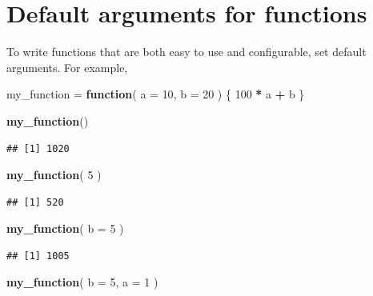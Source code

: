 \documentclass[
]{book}
\newenvironment{Shaded}{\begin{snugshade}}{\end{snugshade}}
\newcommand{\AttributeTok}[1]{\textcolor[rgb]{0.13,0.29,0.53}{#1}}
\newcommand{\ControlFlowTok}[1]{\textcolor[rgb]{0.13,0.29,0.53}{\textbf{#1}}}
\newcommand{\DecValTok}[1]{\textcolor[rgb]{0.00,0.00,0.81}{#1}}
\newcommand{\FunctionTok}[1]{\textcolor[rgb]{0.13,0.29,0.53}{\textbf{#1}}}
\newcommand{\NormalTok}[1]{#1}
\newcommand{\OtherTok}[1]{\textcolor[rgb]{0.56,0.35,0.01}{#1}}
\newcommand{\SpecialCharTok}[1]{\textcolor[rgb]{0.81,0.36,0.00}{\textbf{#1}}}
\begin{document}
\section{Default arguments for functions}\label{default-arguments}

To write functions that are both easy to use and configurable, set default arguments.
For example,

\begin{Shaded}
\begin{Highlighting}[]
\NormalTok{my\_function }\OtherTok{=} \ControlFlowTok{function}\NormalTok{( }\AttributeTok{a =} \DecValTok{10}\NormalTok{, }\AttributeTok{b =} \DecValTok{20}\NormalTok{ ) \{}
     \DecValTok{100} \SpecialCharTok{*}\NormalTok{ a }\SpecialCharTok{+}\NormalTok{ b}
\NormalTok{\}}

\FunctionTok{my\_function}\NormalTok{()}
\end{Highlighting}
\end{Shaded}

\begin{verbatim}
## [1] 1020
\end{verbatim}

\begin{Shaded}
\begin{Highlighting}[]
\FunctionTok{my\_function}\NormalTok{( }\DecValTok{5}\NormalTok{ )}
\end{Highlighting}
\end{Shaded}

\begin{verbatim}
## [1] 520
\end{verbatim}

\begin{Shaded}
\begin{Highlighting}[]
\FunctionTok{my\_function}\NormalTok{( }\AttributeTok{b =} \DecValTok{5}\NormalTok{ )}
\end{Highlighting}
\end{Shaded}

\begin{verbatim}
## [1] 1005
\end{verbatim}

\begin{Shaded}
\begin{Highlighting}[]
\FunctionTok{my\_function}\NormalTok{( }\AttributeTok{b =} \DecValTok{5}\NormalTok{, }\AttributeTok{a =} \DecValTok{1}\NormalTok{ )}
\end{Highlighting}
\end{Shaded}
\end{document}
